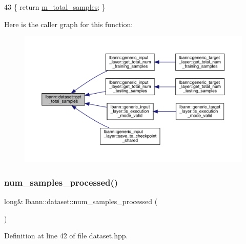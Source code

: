 \begin{DoxyCode}
43 \{ \textcolor{keywordflow}{return} \hyperlink{classlbann_1_1dataset_a2bfe72a2783e0a47e725e91dfb13d06a}{m\_total\_samples}; \}
\end{DoxyCode}
Here is the caller graph for this function\+:\nopagebreak
\begin{figure}[H]
\begin{center}
\leavevmode
\includegraphics[width=350pt]{classlbann_1_1dataset_ad314847b347d413162a9d9eab759641f_icgraph}
\end{center}
\end{figure}
\mbox{\label{classlbann_1_1dataset_a412b29a50638f7d8feea4ad368c6a4dc}} 
\subsubsection{\texorpdfstring{num\+\_\+samples\+\_\+processed()}{num\_samples\_processed()}}
{\footnotesize\ttfamily long\& lbann\+::dataset\+::num\+\_\+samples\+\_\+processed (\begin{DoxyParamCaption}{ }\end{DoxyParamCaption})\hspace{0.3cm}{\ttfamily [inline]}}



Definition at line 42 of file dataset.\+hpp.


